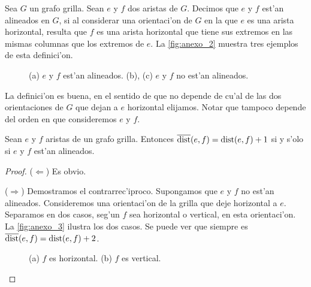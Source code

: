 \begin{definition}
Sea $G$ un grafo grilla. Sean $e$ y $f$ dos aristas de $G$. Decimos que $e$ y $f$ est'an alineados en $G$, si al considerar una orientaci'on de $G$ en la que $e$ es una arista horizontal, resulta que $f$ es una arista horizontal que tiene sus extremos en las mismas columnas que los extremos de $e$. La \autoref{fig:anexo_2} muestra tres ejemplos de esta definici'on.
\end{definition}

\begin{figure}[h]
	\begin{center}
		
	\end{center}		
	\caption{(a) $e$ y $f$ est'an alineados. (b), (c) $e$ y $f$ no est'an alineados.}
	\label{fig:anexo_2}
\end{figure}

La definici'on es buena, en el sentido de que no depende de cu'al de las dos orientaciones de $G$ que dejan a $e$ horizontal elijamos. Notar que tampoco depende del orden en que consideremos $e$ y $f$.

\begin{lemma}
\label{le:aligned_edges}
Sean $e$ y $f$ aristas de un grafo grilla. Entonces $\overline{\textnormal{dist}}(e, f) = \textnormal{dist}(e, f) + 1$ si y s'olo si $e$ y $f$ est'an alineados.

\begin{proof}
($\Leftarrow$) Es obvio.

($\Rightarrow$) Demostramos el contrarrec'iproco. Supongamos que $e$ y $f$ no est'an alineados. Consideremos una orientaci'on de la grilla que deje horizontal a $e$. Separamos en dos casos, seg'un $f$ sea horizontal o vertical, en esta orientaci'on. La \autoref{fig:anexo_3} ilustra los dos casos. Se puede ver que siempre es $\overline{\textnormal{dist}}(e, f) = \textnormal{dist}(e, f) + 2$.

\begin{figure}[h]
	\begin{center}
		
	\end{center}		
	\caption{(a) $f$ es horizontal. (b) $f$ es vertical.}
	\label{fig:anexo_3}
\end{figure}
\end{proof}
\end{lemma}

